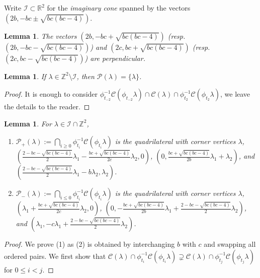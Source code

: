 \documentclass{amsart}
\newtheorem{lemma}[theorem]{Lemma}
\numberwithin{theorem}{section}
\newcommand{\cC}{\mathcal{C}}
\newcommand{\cI}{\mathcal{I}}
\newcommand{\cP}{\mathcal{P}}
\newcommand{\RR}{\mathbb{R}}
\newcommand{\ZZ}{\mathbb{Z}}
\begin{document}
  Write $\cI \subset \RR^2$ for the \emph{imaginary cone} spanned by the vectors $(2b,-bc\pm\sqrt{bc(bc-4)})$.
  \begin{lemma}
    The vectors $(2b, -bc+\sqrt{bc(bc-4)})$ (resp. $(2b, -bc-\sqrt{bc(bc-4)})$) and $(2c, bc+\sqrt{bc(bc-4)})$ (resp. $(2c, bc-\sqrt{bc(bc-4)})$) are perpendicular.
  \end{lemma}

  \begin{lemma}
    If $\lambda\in\ZZ^2\setminus\cI$, then $\cP(\lambda)=\{\lambda\}$.
  \end{lemma}
  \begin{proof}
    It is enough to consider $\phi_{t_{-2}}^{-1}\cC(\phi_{t_{-2}}\lambda) \cap \cC(\lambda) \cap \phi_{t_2}^{-1}\cC(\phi_{t_2}\lambda)$, we leave the details to the reader.
  \end{proof}

  \begin{lemma}
    \label{le:one direction}
    For $\lambda\in\cI\cap\ZZ^2$, 
    \begin{enumerate}
      \item $\cP_+(\lambda):=\bigcap_{i \ge 0}\phi_{t_i}^{-1}\cC(\phi_{t_i}\lambda)$ is the quadrilateral with corner vertices $\lambda$, $(\frac{2-bc-\sqrt{bc(bc-4)}}{2}\lambda_1-\frac{bc+\sqrt{bc(bc-4)}}{2c}\lambda_2,0)$, $(0,\frac{bc+\sqrt{bc(bc-4)}}{2b}\lambda_1+\lambda_2)$, and $(\frac{2-bc-\sqrt{bc(bc-4)}}{2}\lambda_1-b\lambda_2,\lambda_2)$.
      \item $\cP_-(\lambda):=\bigcap_{i \le 0}\phi_{t_i}^{-1}\cC(\phi_{t_i}\lambda)$ is the quadrilateral with corner vertices $\lambda$, $(\lambda_1+\frac{bc+\sqrt{bc(bc-4)}}{2c}\lambda_2,0)$, $(0,-\frac{bc+\sqrt{bc(bc-4)}}{2b}\lambda_1+\frac{2-bc-\sqrt{bc(bc-4)}}{2}\lambda_2)$, and $(\lambda_1,-c\lambda_1+\frac{2-bc-\sqrt{bc(bc-4)}}{2}\lambda_2)$.
    \end{enumerate}
  \end{lemma}
  \begin{proof}
    We prove (1) as (2) is obtained by interchanging $b$ with $c$ and swapping all ordered pairs.  
    We first show that $\cC(\lambda) \cap \phi_{t_i}^{-1}\cC(\phi_{t_i}\lambda)\supsetneq \cC(\lambda) \cap \phi_{t_j}^{-1}\cC(\phi_{t_j}\lambda)$ for $0\le i<j$.
  \end{proof}
\end{document}
